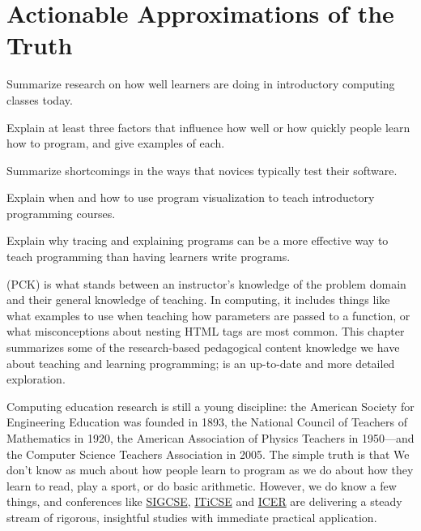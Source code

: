 \chapter{Actionable Approximations of the Truth}\label{s:pck}

\begin{objectives}

\item
  Summarize research on how well learners are doing in introductory
  computing classes today.

\item
  Explain at least three factors that influence how well or how
  quickly people learn how to program, and give examples of each.

\item
  Summarize shortcomings in the ways that novices typically test their
  software.

\item
  Explain when and how to use program visualization to teach
  introductory programming courses.

\item
  Explain why tracing and explaining programs can be a more effective
  way to teach programming than having learners write programs.

\end{objectives}

 (PCK) is what stands between an instructor's knowledge of
the problem domain and their general knowledge of teaching.  In
computing, it includes things like what examples to use when teaching
how parameters are passed to a function, or what misconceptions about
nesting HTML tags are most common.  This chapter summarizes some of
the research-based pedagogical content knowledge we have about
teaching and learning programming; \cite{Sent2018} is an up-to-date
and more detailed exploration.

Computing education research is still a young discipline: the American
Society for Engineering Education was founded in 1893, the National
Council of Teachers of Mathematics in 1920, the American Association
of Physics Teachers in 1950---and the Computer Science Teachers
Association in 2005.  The simple truth is that We don't know as much
about how people learn to program as we do about how they learn to
read, play a sport, or do basic arithmetic.  However, we do know a few
things, and conferences like \href{http://sigcse.org/}{SIGCSE},
\href{http://iticse.acm.org/}{ITiCSE} and
\href{https://icer.hosting.acm.org}{ICER} are delivering a steady
stream of rigorous, insightful studies with immediate practical
application.

